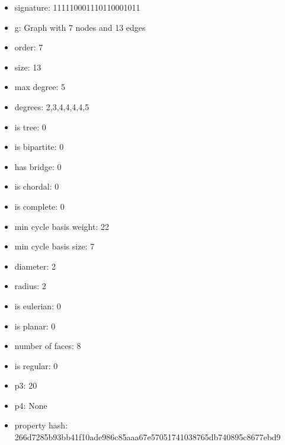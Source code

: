 \begin{itemize}
\item signature: 111110001110110001011
\item g: Graph with 7 nodes and 13 edges
\item order: 7
\item size: 13
\item max degree: 5
\item degrees: 2,3,4,4,4,4,5
\item is tree: 0
\item is bipartite: 0
\item has bridge: 0
\item is chordal: 0
\item is complete: 0
\item min cycle basis weight: 22
\item min cycle basis size: 7
\item diameter: 2
\item radius: 2
\item is eulerian: 0
\item is planar: 0
\item number of faces: 8
\item is regular: 0
\item p3: 20
\item p4: None
\item property hash: 266d7285b93bb41f10ade986c85aaa67e57051741038765db740895c8677ebd9
\end{itemize}
\newpage
\begin{figure}
\end{figure}
